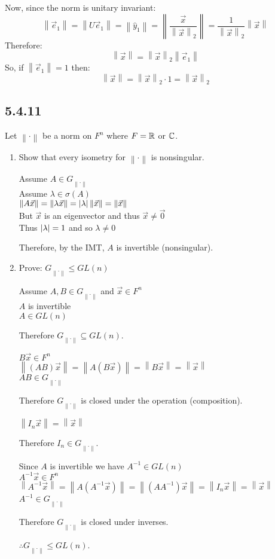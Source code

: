 \documentclass[letterpaper,12pt,fleqn]{article}
\newcommand{\norm}[1]{\left\lVert#1\right\rVert}
\newcommand{\vx}{\vec{x}}
\newcommand{\hy}{\hat{y}}
\newcommand{\ve}{\vec{e}}
\newcommand{\vz}{\vec{0}}
\renewcommand{\l}{\lambda}
\renewcommand{\o}{\sigma}
\newcommand{\nc}{\norm{\cdot}}
\newcommand{\ig}{G_{\nc}}
\begin{document}
Now, since the norm is unitary invariant:
\[\norm{\ve_1}=\norm{U\ve_1}=\norm{\hy_1}=\norm{\frac{\vx}{\norm{\vx}_2}}=
\frac{1}{\norm{\vx}_2}\norm{\vx}\]
Therefore:
\[\norm{\vx}=\norm{\vx}_2\norm{\ve_1}\]
So, if $\norm{\ve_1}=1$ then:
\[\norm{\vx}=\norm{\vx}_2\cdot1=\norm{\vx}_2\]

\subsection*{5.4.11}

Let $\nc$ be a norm on $F^n$ where $F=\mathbb{R}$ or $\mathbb{C}$.
\begin{enumerate}[label={\alph*)}]
\item Show that every isometry for $\nc$ is nonsingular.

  Assume $A\in\ig$ \\
  Assume $\l\in\o(A)$ \\
  $\norm{A\vx}=\norm{\l\vx}=\abs{\l}\norm{\vx}=\norm{\vx}$ \\
  But $\vx$ is an eigenvector and thus $\vx\ne\vz$ \\
  Thus $\abs{\l}=1$ and so $\l\ne0$

  Therefore, by the IMT, $A$ is invertible (nonsingular).

\item Prove: $\ig\le GL(n)$

  Assume $A,B\in\ig$ and $\vx\in F^n$ \\
  $A$ is invertible \\
  $A\in GL(n)$

  Therefore $\ig\subseteq GL(n)$.

  $B\vx\in F^n$ \\
  $\norm{(AB)\vx}=\norm{A(B\vx)}=\norm{B\vx}=\norm{\vx}$ \\
  $AB\in\ig$

  Therefore $\ig$ is closed under the operation (composition).

  $\norm{I_n\vx}=\norm{\vx}$

  Therefore $I_n\in\ig$.

  Since $A$ is invertible we have $A^{-1}\in GL(n)$ \\
  $A^{-1}\vx\in F^n$ \\
  $\norm{A^{-1}\vx}=\norm{A(A^{-1}\vx)}=\norm{(AA^{-1})\vx}=\norm{I_n\vx}=
  \norm{\vx}$ \\
  $A^{-1}\in\ig$

  Therefore $\ig$ is closed under inverses.

  $\therefore\ig\le GL(n)$.


\end{enumerate}
\end{document}
